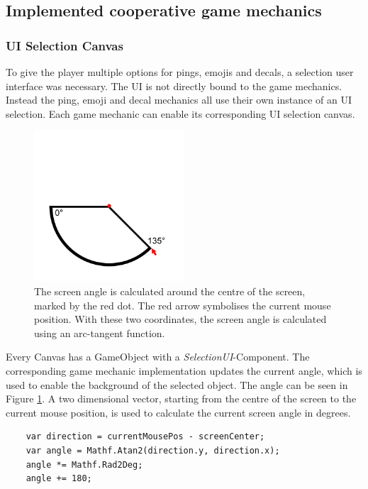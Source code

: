 \subsection{Implemented cooperative game mechanics}
\label{section:Implemented cooperative game mechanics}

\subsubsection{UI Selection Canvas}

To give the player multiple options for pings, emojis and decals, a selection user interface was necessary. The UI is not directly bound to the game mechanics. Instead the ping, emoji and decal mechanics all use their own instance of an UI selection.
Each game mechanic can enable its corresponding UI selection canvas.

\begin{figure}
    \centering
    \includegraphics[width=0.5\textwidth]{images/angle_calculation.png}
    \caption{The screen angle is calculated around the centre of the screen, marked by the red dot. The red arrow symbolises the current mouse position. With these two coordinates, the screen angle is calculated using an arc-tangent function.}
    \label{fig:angle calculation}
\end{figure}

Every Canvas has a GameObject with a \textit{SelectionUI}-Component. The corresponding game mechanic implementation updates the current angle, which is used to enable the background of the selected object. The angle can be seen in Figure \ref{fig:angle calculation}. A two dimensional vector, starting from the centre of the screen to the current mouse position, is used to calculate the current screen angle in degrees.

\begin{verbatim}
    var direction = currentMousePos - screenCenter;
    var angle = Mathf.Atan2(direction.y, direction.x);
    angle *= Mathf.Rad2Deg;
    angle += 180;
\end{verbatim}

